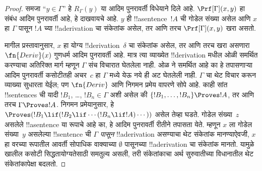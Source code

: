\documentclass[../../../include/open-logic-section]{subfiles}
\begin{document}
\begin{proof}
समजा ``$y \in \Gamma$'' हे $R_\Gamma(y)$ या आदिम पुनरावर्ती
विधेयाने दिले आहे. $\Prf[\Gamma](x, y)$ हा संबंध आदिम पुनरावर्ती
आहे, हे दाखवायचे आहे. $y$ ही !!a{sentence}~$!A$ ची गोडेल संख्या
असेल आणि $x$ हा $\Gamma$ पासून $!A$ च्या
!!a{derivation} चा संकेतांक असेल, तर आणि तरच
$\Prf[\Gamma](x, y)$ खरा असतो.

मागील प्रस्तावानुसार, $x$ हा योग्य !!{derivation}~$\delta$
चा संकेतांक असेल, तर आणि तरच खरा असणारा $\fn{Deriv}(x)$
गुणधर्म आदिम पुनरावर्ती आहे. मात्र त्या व्याख्येत
!!{derivation} मधील ओळी समर्थित करण्याचा अतिरिक्त मार्ग म्हणून
$\Gamma$ संच विचारात घेतलेला नाही. ओळ \QR{} ने समर्थित आहे
का हे तपासणाऱ्या आदिम पुनरावर्ती कसोटीतही अचर~$c$ हा
$\Gamma$ मध्ये येऊ नये ही अट घेतलेली नाही. $\Gamma$ चा
थेट विचार करून व्याख्या सुधारता येईल; पण $\fn{Deriv}$ आणि
निगमन प्रमेय वापरणे सोपे आहे. काही सांत !!{sentence}s ची यादी
$!B_1$, \dots, $!B_n \in \Gamma$ अशी असेल की
$\{!B_1, \dots, !B_n\} \Proves !A$, तर आणि तरच
$\Gamma \Proves !A$. निगमन प्रमेयानुसार, हे
$\Proves (!B_1 \lif (!B_2 \lif
\cdots (!B_n \lif !A)\cdots))$ असेल तेव्हा घडते.
गोडेल संख्या~$z$ असलेले !!a{sentence} या रूपाचे आहे का,
हे आदिम पुनरावर्ती रीतीने तपासता येते. म्हणून $x$ ला
गोडेल संख्या~$y$ असलेल्या !!{sentence} ची \emph{$\Gamma$ पासून}
!!a{derivation} असण्याचा थेट संकेतांक मानण्याऐवजी,
$x$ हा वरच्या रूपातील आवर्ती सोपाधिक वाक्याच्या
$\emptyset$ पासूनच्या !!a{derivation} चा संकेतांक मानतो.
यामुळे खालील कसोटी सिद्धतायोग्यतेसाठी समतुल्य असली,
तरी संकेतांकाचा अर्थ सुरुवातीच्या विधानातील थेट संकेतांकापेक्षा बदलतो.


\end{proof}
\end{document}
